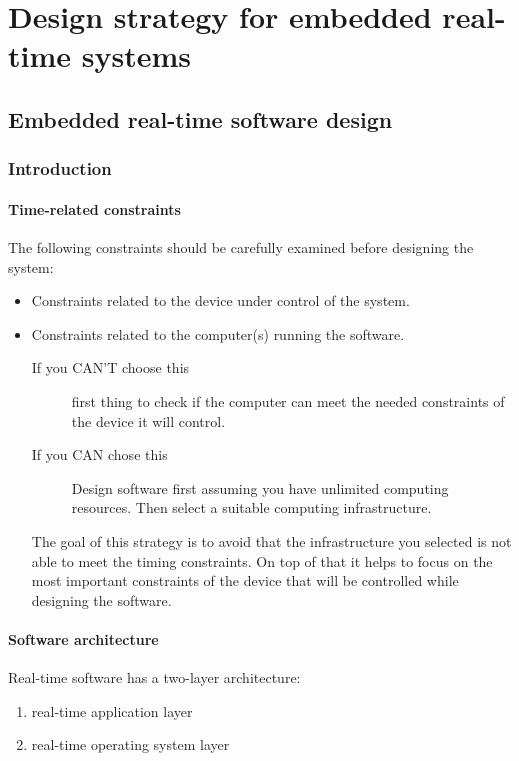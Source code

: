 \documentclass[../main.tex]{subfiles}
\begin{document}
\chapter{Design strategy for embedded real-time systems}

\section{Embedded real-time software design}
\subsection{Introduction}

\subsubsection{Time-related constraints}
The following constraints should be carefully examined before designing the system: 
\begin{itemize}
	\item Constraints related to the device under control of the system. 
	\item Constraints related to the computer(s) running the software. 
		\begin{description}
			\item[If you CAN'T choose this] first thing to check if the computer can meet the needed constraints of the device it will control.
				\item[If you CAN  chose this] Design software first assuming you have unlimited computing resources. Then select a suitable computing infrastructure.
		\end{description} 
	The goal of this strategy is to avoid that the infrastructure you selected is not able to meet the timing constraints. On top of that it helps to focus on the most important constraints of the device that will be controlled while designing the software.
\end{itemize}




\subsubsection{Software architecture}
Real-time software has a two-layer architecture: 
\begin{enumerate}
	\item real-time application layer
	\item real-time operating system layer
\end{enumerate}
\end{document}
